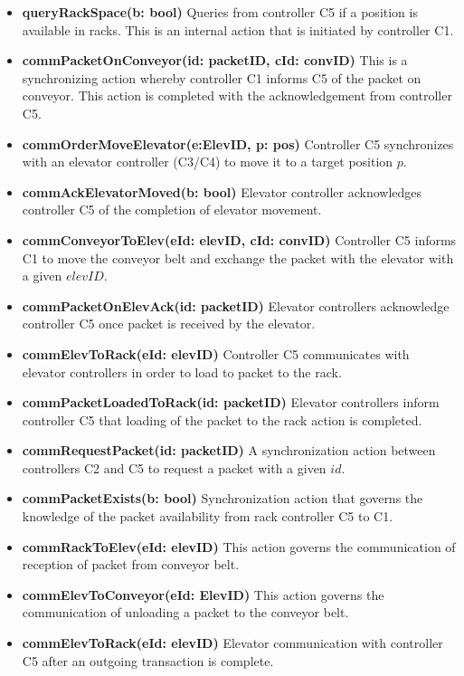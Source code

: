 \begin{itemize}
\item \textbf{queryRackSpace(b: bool)}
Queries from controller C5 if a position is available in racks. This is an internal action that is initiated by controller C1.

\item \textbf{commPacketOnConveyor(id: packetID, cId: convID)}
This is a synchronizing action whereby controller C1 informs C5 of the packet on conveyor. This action is completed with the acknowledgement from controller C5.

\item \textbf{commOrderMoveElevator(e:ElevID, p: pos)}
Controller C5 synchronizes with an elevator controller (C3/C4) to move it to a target position $p$.

\item \textbf{commAckElevatorMoved(b: bool)}
Elevator controller acknowledges controller C5 of the completion of elevator movement.

\item \textbf{commConveyorToElev(eId: elevID, cId: convID)}
Controller C5 informs C1 to move the conveyor belt and exchange the packet with the elevator with a given $elevID$.

\item \textbf{commPacketOnElevAck(id: packetID)}
Elevator controllers acknowledge controller C5 once packet is received by the elevator.

\item \textbf{commElevToRack(eId: elevID)}
Controller C5 communicates with elevator controllers in order to load to packet to the rack.

\item \textbf{commPacketLoadedToRack(id: packetID)}
Elevator controllers inform controller C5 that loading of the packet to the rack action is completed.

\item \textbf{commRequestPacket(id: packetID)}
A synchronization action between controllers C2 and C5 to request a packet with a given $id$.

\item \textbf{commPacketExists(b: bool)}
Synchronization action that governs the knowledge of the packet availability from rack controller C5 to C1.

\item \textbf{commRackToElev(eId:  elevID)}
This action governs the communication of reception of packet from conveyor belt.

\item \textbf{commElevToConveyor(eId: ElevID)}
This action governs the communication of unloading a packet to the conveyor belt.

\item \textbf{commElevToRack(eId: elevID)}
Elevator communication with controller C5 after an outgoing transaction is complete.
\end{itemize}

